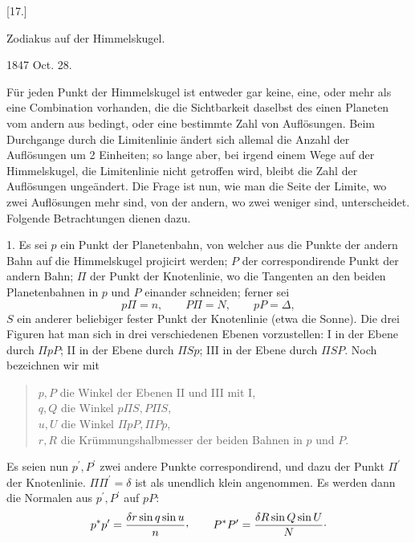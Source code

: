\hypertarget{native-322-zusatz17}{}
\begin{center}
[17.]

Zodiakus auf der Himmelskugel.

1847 Oct. 28.
\end{center}

Für jeden Punkt der Himmelskugel ist entweder gar keine, eine, oder mehr als eine Combination vorhanden, die die Sichtbarkeit daselbst des einen Planeten vom andern aus bedingt, oder eine bestimmte Zahl von Auflösungen. Beim Durchgange durch die Limitenlinie ändert sich allemal die Anzahl der Auflösungen um 2 Einheiten; so lange aber, bei irgend einem Wege auf der Himmelskugel, die Limitenlinie nicht getroffen wird, bleibt die Zahl der Auflösungen ungeändert. Die Frage ist nun, wie man die Seite der Limite, wo zwei Auflösungen mehr sind, von der andern, wo zwei weniger sind, unterscheidet. Folgende Betrachtungen dienen dazu.

1. Es sei \(p\) ein Punkt der Planetenbahn, von welcher aus die Punkte der andern Bahn auf die Himmelskugel projicirt werden; \(P\) der correspondirende Punkt der andern Bahn; \(\Pi\) der Punkt der Knotenlinie, wo die Tangenten an den beiden Planetenbahnen in \(p\) und \(P\) einander schneiden; ferner sei
\[
p\Pi=n,\qquad P\Pi=N,\qquad pP=\Delta,
\]
\(S\) ein anderer beliebiger fester Punkt der Knotenlinie (etwa die Sonne). Die drei Figuren hat man sich in drei verschiedenen Ebenen vorzustellen: I in der Ebene durch \(\Pi pP\); II in der Ebene durch \(\Pi Sp\); III in der Ebene durch \(\Pi SP\). Noch bezeichnen wir mit
\begin{quote}
\noindent \(p,P\) die Winkel der Ebenen II und III mit I,\\
\(q,Q\) die Winkel \(p\Pi S,P\Pi S\),\\
\(u,U\) die Winkel \(\Pi pP,\Pi Pp\),\\
\(r,R\) die Krümmungshalbmesser der beiden Bahnen in \(p\) und \(P\).
\end{quote}

Es seien nun \(p^{\prime},P^{\prime}\) zwei andere Punkte correspondirend, und dazu der Punkt \(\Pi^{\prime}\) der Knotenlinie. \(\Pi\Pi^{\prime}=\delta\) ist als unendlich klein angenommen. Es werden dann die Normalen aus \(p^{\prime},P^{\prime}\) auf \(pP\):
\[
p^{*}p^{\prime}=\frac{\delta r\sin q\sin u}{n}\mathpunct{\raisebox{.45ex}{\normalfont,}}\qquad
P^{*}P^{\prime}=\frac{\delta R\sin Q\sin U}{N}\mathpunct{\cdot}
\]

